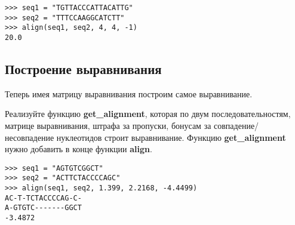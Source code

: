 \documentclass{article}
\begin{document}
\begin{verbatim}
>>> seq1 = "TGTTACCCATTACATTG"
>>> seq2 = "TTTCCAAGGCATCTT"
>>> align(seq1, seq2, 4, 4, -1)
20.0
\end{verbatim}

\subsection*{Построение выравнивания}
Теперь имея матрицу выравнивания построим самое выравнивание.

Реализуйте функцию \textbf{get\_alignment}, которая по двум последовательностям, матрице выравнивания, штрафа за пропуски, бонусам за совпадение/несовпадение нуклеотидов строит выравнивание. Функцию \textbf{get\_alignment} нужно добавить в конце функции \textbf{align}.

\begin{verbatim}
>>> seq1 = "AGTGTCGGCT"
>>> seq2 = "ACTTCTACCCCAGC"
>>> align(seq1, seq2, 1.399, 2.2168, -4.4499)
AC-T-TCTACCCCAG-C-
A-GTGTC-------GGCT
-3.4872
\end{verbatim}
\end{document}

